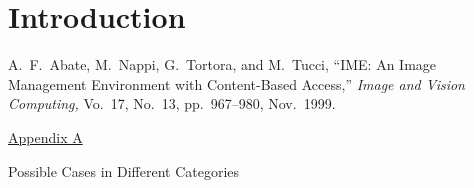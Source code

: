


\newtheorem{definition}{Definition}
\renewcommand{\thedefinition}{\arabic{definition}.}
\newtheorem{theorem}{Theorem}
\renewcommand{\thetheorem}{\arabic{theorem}.}
\newtheorem{lemma}{Lemma}
\renewcommand{\thelemma}{\arabic{lemma}.}
\newcommand{\ecc}{\stepcounter{ec} \arabic{ec}}

\setlength{\baselineskip}{4ex} \setlength{\parskip}{0pt}
\setlength{\parindent}{0.5cm}





\section{Introduction}



\setlength{\baselineskip}{12pt}
\begin{thebibliography}{99}



 A.~F.~Abate, M.~Nappi, G.~Tortora, and M.~Tucci,
``IME: An Image Management Environment with Content-Based Access,''
{\em Image and Vision Computing,}
Vo.~17, No.~13, pp.~967--980, Nov.~1999.



\end{thebibliography}



\newpage
\begin{center}
{\Large \underline{Appendix A}}



\vspace{0.5cm}



Possible Cases in Different Categories



\end{center}
\vspace{0.5cm}



